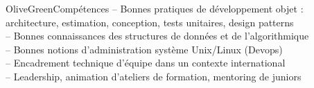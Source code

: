 \documentclass{cv}
\begin{document}
\vspace{0.2cm}

\begin{rubriquetableau}[18cm]{OliveGreen}{Compétences}
-- Bonnes pratiques de développement objet : architecture, estimation, conception, tests unitaires, design patterns\\
-- Bonnes connaissances des structures de données et de l'algorithmique\\
-- Bonnes notions d'administration système Unix/Linux (Devops)\\
-- Encadrement technique d'équipe dans un contexte international\\
-- Leadership, animation d'ateliers de formation, mentoring de juniors\\
\end{rubriquetableau}

\vspace{0.2cm}
\end{document}

